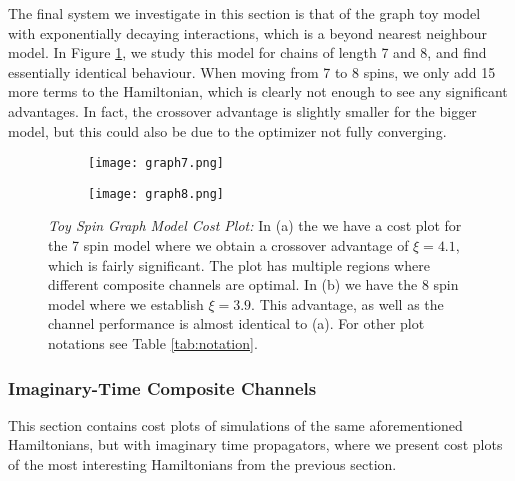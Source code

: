 The final system we investigate in this section is that of the graph toy model with exponentially decaying interactions, which is a beyond nearest neighbour model. In Figure \ref{fig:graph_sim}, we study this model for chains of length 7 and 8, and find essentially identical behaviour. When moving from 7 to 8 spins, we only add 15 more terms to the Hamiltonian, which is clearly not enough to see any significant advantages. In fact, the crossover advantage is slightly smaller for the bigger model, but this could also be due to the optimizer not fully converging. 

\begin{figure}[htbp!]
\centering
    \begin{subfigure}[b]{.49\textwidth}
        \texttt{[image: graph7.png]}
        \caption{} 
    \end{subfigure}
    \begin{subfigure}[b]{.49\textwidth}
        \texttt{[image: graph8.png]}
        \caption{} 
    \end{subfigure}
    \caption{\textit{Toy Spin Graph Model Cost Plot:} In (a) the we have a cost plot for the 7 spin model where we obtain a crossover advantage of $\xi = 4.1$, which is fairly significant. The plot has multiple regions where different composite channels are optimal. In (b) we have the 8 spin model where we establish $\xi = 3.9$. This advantage, as well as the channel performance is almost identical to (a). For other plot notations see Table \ref{tab:notation}.}
    \label{fig:graph_sim}
\end{figure} 
\FloatBarrier

\subsubsection{Imaginary-Time Composite Channels} \label{subsubsec:iTime_results}
This section contains cost plots of simulations of the same aforementioned Hamiltonians, but with imaginary time propagators, where we present cost plots of the most interesting Hamiltonians from the previous section.\\

